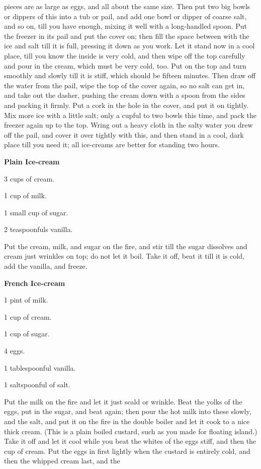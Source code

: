 \documentclass[11pt]{book}
\newcommand{\indpar}{\par\noindent\hspace*{\parindent}}
\newcommand{\ingredient}{\indpar}
\newcommand{\instruction}{\indpar}
\newenvironment{RecipeTitle}{\medskip\begin{center}\large\bf }{\end{center}\smallskip}
\begin{document}
pieces are as large as eggs, and all about the same size.
Then put two big bowls or dippers of this into a tub or pail,
and add one bowl or dipper of coarse salt, and so on, till you
have enough, mixing it well with a long-handled spoon.  Put
the freezer in its pail and put the cover on; then fill the
space between with the ice and salt till it is full, pressing
it down as you work.  Let it stand now in a cool place, till
you know the inside is very cold, and then wipe off the top
carefully and pour in the cream, which must be very cold, too.
Put on the top and turn smoothly and slowly till it is stiff,
which should be fifteen minutes.  Then draw off the water from
the pail, wipe the top of the cover again, so no salt can get
in, and take out the dasher, pushing the cream down with a
spoon from the sides and packing it firmly.  Put a cork in the
hole in the cover, and put it on tightly.  Mix more ice with a
little salt; only a cupful to two bowls this time, and pack
the freezer again up to the top.  Wring out a heavy cloth in
the salty water you drew off the pail, and cover it over
tightly with this, and then stand in a cool, dark place till
you need it; all ice-creams are better for standing two hours.
\begin{RecipeTitle}
Plain Ice-cream\label{plain_ice_cream}
\end{RecipeTitle}
\ingredient  3 cups of cream.
\ingredient  1 cup of milk.
\ingredient  1 small cup of sugar.
\ingredient  2 teaspoonfuls vanilla.
\instruction  Put the cream, milk, and sugar on the fire, and stir till
the sugar dissolves and cream just wrinkles on top; do not let
it boil.  Take it off, beat it till it is cold, add the
vanilla, and freeze.
\begin{RecipeTitle}
French Ice-cream\label{french_ice_cream}
\end{RecipeTitle}
\ingredient  1 pint of milk.
\ingredient  1 cup of cream.
\ingredient  1 cup of sugar.
\ingredient  4 eggs.
\ingredient  1 tablespoonful vanilla.
\ingredient  1 saltspoonful of salt.
\instruction  Put the milk on the fire and let it just scald or wrinkle.
Beat the yolks of the eggs, put in the sugar, and beat again;
then pour the hot milk into these slowly, and the salt, and
put it on the fire in the double boiler and let it cook to a
nice thick cream.  (This is a plain boiled custard, such as
you made for floating island.)  Take it off and let it cool
while you beat the whites of the eggs stiff, and then the cup
of cream.  Put the eggs in first lightly when the custard is
entirely cold, and then the whipped cream last, and the
\end{document}

